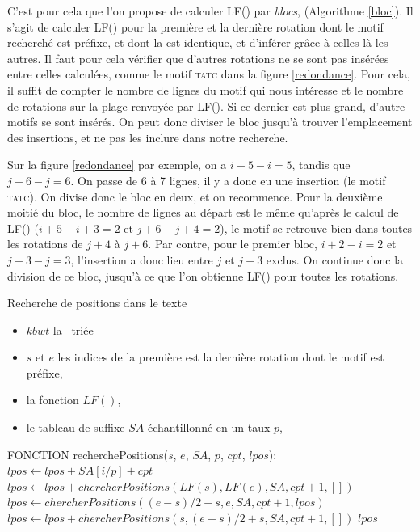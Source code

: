C'est pour cela que l'on propose de calculer LF() par \textit{blocs}, (Algorithme \ref{bloc}). Il s'agit de calculer LF() pour la première et la dernière rotation dont le motif recherché est préfixe, et dont la \kbwt est identique, et d'inférer grâce à celles-là les autres. Il faut pour cela vérifier que d'autres rotations ne se sont pas insérées entre celles calculées, comme le motif \textsc{tatc} dans la figure \ref{redondance}. Pour cela, il suffit de compter le nombre de lignes du motif qui nous intéresse et le nombre de rotations sur la plage renvoyée par LF(). Si ce dernier est plus grand, d'autre motifs se sont insérés. On peut donc diviser le bloc jusqu'à trouver l'emplacement des insertions, et ne pas les inclure dans notre recherche.

Sur la figure \ref{redondance} par exemple, on a $i+5 - i = 5$, tandis que $j+6 - j = 6$. On passe de 6 à 7 lignes, il y a donc eu une insertion (le motif \textsc{tatc}). On divise donc le bloc en deux, et on recommence. Pour la deuxième moitié du bloc, le nombre de lignes au départ est le même qu'après le calcul de LF() ($i+5 - i+3 = 2$ et $j+6 - j+4 = 2$), le motif se retrouve bien dans toutes les rotations de $j+4$ à $j+6$. Par contre, pour le premier bloc, $i+2 - i = 2$ et $j+3 - j = 3$, l'insertion a donc lieu entre $j$ et $j+3$ exclus. On continue donc la division de ce bloc, jusqu'à ce que l'on obtienne LF() pour toutes les rotations.


\begin{algorithm}
\caption{Recherche de positions dans le texte}	
\label{bloc}	
	\begin{algorithmic}
	\REQUIRE 
		\begin{itemize}
			\item $kbwt$ la \kbwt\ triée
			\item $s$ et $e$ les indices de la première est la dernière rotation dont le motif est préfixe, 
			\item la fonction $LF()$, 
			\item le tableau de suffixe $SA$ échantillonné en un taux $p$, 
		\end{itemize}
	\STATE FONCTION recherchePositions($s$, $e$, $SA$, $p$, $cpt$, $lpos$): \\
		\STATE $lpos \gets lpos + SA[i/p] + cpt$
	\ENDFOR
		\STATE $lpos \gets lpos + chercherPositions(LF(s), LF(e), SA, cpt+1, [])$
	\ELSE
		\STATE $lpos \gets chercherPositions((e-s)/2 +s, e, SA, cpt+1, lpos)$
		\STATE $lpos \gets lpos + chercherPositions(s, (e-s)/2 +s, SA, cpt+1, [])$
	\ENDIF
	\RETURN $lpos$
	\end{algorithmic}
\end{algorithm}



